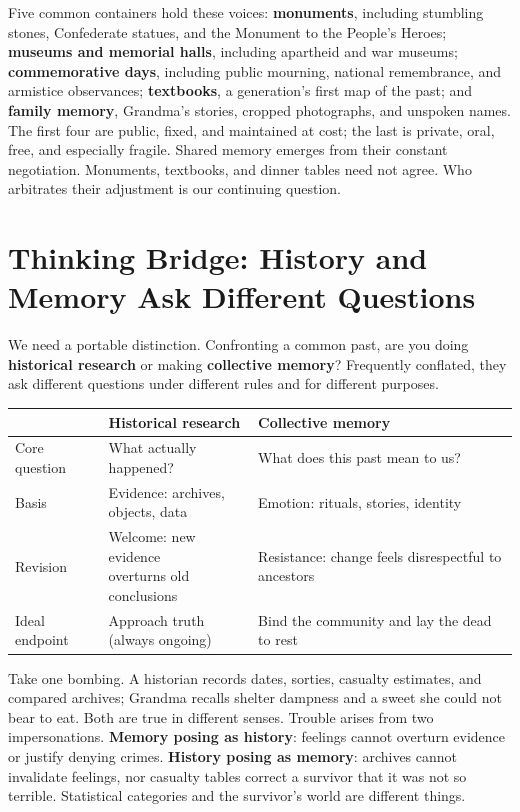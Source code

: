 Five common containers hold these voices: \textbf{monuments}, including stumbling stones, Confederate statues, and the Monument to the People's Heroes; \textbf{museums and memorial halls}, including apartheid and war museums; \textbf{commemorative days}, including public mourning, national remembrance, and armistice observances; \textbf{textbooks}, a generation's first map of the past; and \textbf{family memory}, Grandma's stories, cropped photographs, and unspoken names. The first four are public, fixed, and maintained at cost; the last is private, oral, free, and especially fragile. Shared memory emerges from their constant negotiation. Monuments, textbooks, and dinner tables need not agree. Who arbitrates their adjustment is our continuing question.

\section[Thinking Bridge: History and Memory]{Thinking Bridge: History and Memory Ask Different Questions}
We need a portable distinction. Confronting a common past, are you doing \textbf{historical research} or making \textbf{collective memory}? Frequently conflated, they ask different questions under different rules and for different purposes.

\noindent
\begin{tabularx}{\linewidth}{llX}
\toprule
 & Historical research & Collective memory \\
\midrule
Core question & What actually happened? & What does this past mean to us? \\
Basis & \shortstack[l]{Evidence: archives,\\ objects, data} & Emotion: rituals, stories, identity \\
Revision & \shortstack[l]{Welcome: new evidence\\ overturns old conclusions} & Resistance: change feels disrespectful to ancestors \\
Ideal endpoint & \shortstack[l]{Approach truth\\ (always ongoing)} & Bind the community and lay the dead to rest \\
\bottomrule
\end{tabularx}

\smallskip
Take one bombing. A historian records dates, sorties, casualty estimates, and compared archives; Grandma recalls shelter dampness and a sweet she could not bear to eat. Both are true in different senses. Trouble arises from two impersonations. \textbf{Memory posing as history}: feelings cannot overturn evidence or justify denying crimes. \textbf{History posing as memory}: archives cannot invalidate feelings, nor casualty tables correct a survivor that it was not so terrible. Statistical categories and the survivor's world are different things.

